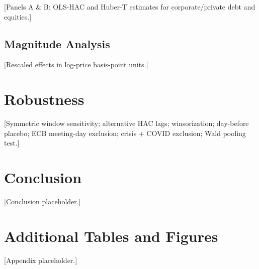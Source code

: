 \documentclass[12pt]{article}
\begin{document}
[Panels A \& B: OLS-HAC and Huber-T estimates for corporate/private debt
and equities.]

\subsection{Magnitude Analysis}

[Rescaled effects in log-price basis-point units.]

\section{Robustness}
\label{sec:robustness}

[Symmetric window sensitivity; alternative HAC lags; winsorization; day-before
placebo; ECB meeting-day exclusion; crisis + COVID exclusion; Wald pooling test.]

\section{Conclusion}
\label{sec:conclusion}

[Conclusion placeholder.]




\clearpage
\appendix

\section{Additional Tables and Figures}
\label{app:tables}

[Appendix placeholder.]

\end{document}
